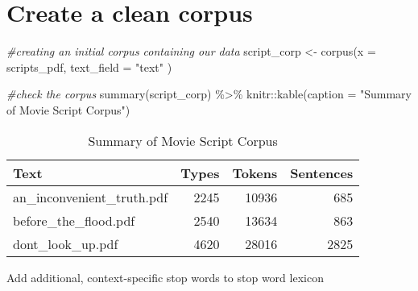 \documentclass[
]{article}
\newenvironment{Shaded}{\begin{snugshade}}{\end{snugshade}}
\newcommand{\AttributeTok}[1]{\textcolor[rgb]{0.77,0.63,0.00}{#1}}
\newcommand{\CommentTok}[1]{\textcolor[rgb]{0.56,0.35,0.01}{\textit{#1}}}
\newcommand{\FunctionTok}[1]{\textcolor[rgb]{0.00,0.00,0.00}{#1}}
\newcommand{\NormalTok}[1]{#1}
\newcommand{\OtherTok}[1]{\textcolor[rgb]{0.56,0.35,0.01}{#1}}
\newcommand{\SpecialCharTok}[1]{\textcolor[rgb]{0.00,0.00,0.00}{#1}}
\newcommand{\StringTok}[1]{\textcolor[rgb]{0.31,0.60,0.02}{#1}}
\begin{document}
\hypertarget{create-a-clean-corpus}{%
\section{Create a clean corpus}\label{create-a-clean-corpus}}

\begin{Shaded}
\begin{Highlighting}[]
\CommentTok{\#creating an initial corpus containing our data}
\NormalTok{script\_corp }\OtherTok{\textless{}{-}} \FunctionTok{corpus}\NormalTok{(}\AttributeTok{x =}\NormalTok{ scripts\_pdf, }\AttributeTok{text\_field =} \StringTok{"text"}\NormalTok{ )}

\CommentTok{\#check the corpus }
\FunctionTok{summary}\NormalTok{(script\_corp) }\SpecialCharTok{\%\textgreater{}\%} 
\NormalTok{  knitr}\SpecialCharTok{::}\FunctionTok{kable}\NormalTok{(}\AttributeTok{caption =} \StringTok{"Summary of Movie Script Corpus"}\NormalTok{)}
\end{Highlighting}
\end{Shaded}

\begin{table}

\caption{\label{tab:unnamed-chunk-3}Summary of Movie Script Corpus}
\centering
\begin{tabular}[t]{l|r|r|r}
\hline
Text & Types & Tokens & Sentences\\
\hline
an\_inconvenient\_truth.pdf & 2245 & 10936 & 685\\
\hline
before\_the\_flood.pdf & 2540 & 13634 & 863\\
\hline
dont\_look\_up.pdf & 4620 & 28016 & 2825\\
\hline
\end{tabular}
\end{table}

Add additional, context-specific stop words to stop word lexicon

\begin{Shaded}
\end{Shaded}
\end{document}
